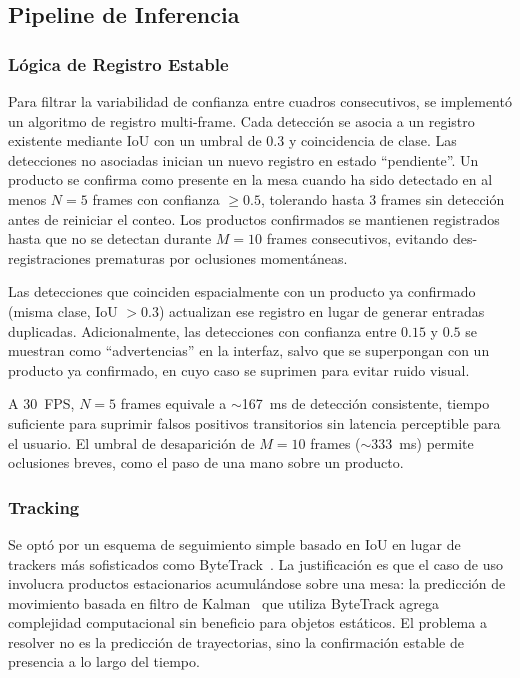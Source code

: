 \documentclass[conference,a4paper]{IEEEtran}[2015/08/26]
\begin{document}
\subsection{Pipeline de Inferencia}
\label{subsec:pipeline}

\subsubsection{Lógica de Registro Estable}

Para filtrar la variabilidad de confianza entre cuadros consecutivos, se implementó un algoritmo de registro multi-frame. Cada detección se asocia a un registro existente mediante IoU con un umbral de $0.3$ y coincidencia de clase. Las detecciones no asociadas inician un nuevo registro en estado ``pendiente''. Un producto se confirma como presente en la mesa cuando ha sido detectado en al menos $N = 5$ frames con confianza $\geq 0.5$, tolerando hasta 3 frames sin detección antes de reiniciar el conteo. Los productos confirmados se mantienen registrados hasta que no se detectan durante $M = 10$ frames consecutivos, evitando des-registraciones prematuras por oclusiones momentáneas.

Las detecciones que coinciden espacialmente con un producto ya confirmado (misma clase, IoU $> 0.3$) actualizan ese registro en lugar de generar entradas duplicadas. Adicionalmente, las detecciones con confianza entre $0.15$ y $0.5$ se muestran como ``advertencias'' en la interfaz, salvo que se superpongan con un producto ya confirmado, en cuyo caso se suprimen para evitar ruido visual.

A 30~FPS, $N = 5$ frames equivale a $\sim$167~ms de detección consistente, tiempo suficiente para suprimir falsos positivos transitorios sin latencia perceptible para el usuario. El umbral de desaparición de $M = 10$ frames ($\sim$333~ms) permite oclusiones breves, como el paso de una mano sobre un producto.

\subsubsection{Tracking}

Se optó por un esquema de seguimiento simple basado en IoU en lugar de trackers más sofisticados como ByteTrack~\cite{zhang2022bytetrack}. La justificación es que el caso de uso involucra productos estacionarios acumulándose sobre una mesa: la predicción de movimiento basada en filtro de Kalman~\cite{bewley2016sort} que utiliza ByteTrack agrega complejidad computacional sin beneficio para objetos estáticos. El problema a resolver no es la predicción de trayectorias, sino la confirmación estable de presencia a lo largo del tiempo.
\end{document}
